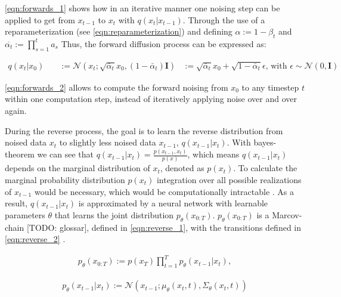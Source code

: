 \autoref{eqn:forwards_1} \cite{ho2020DenoisingDiffusionProbabilistic} shows how in an iterative manner one noising step can be applied to get from $x_{t-1}$ to $x_t$ with $q(x_t | x_{t-1})$.
Through the use of a reparameterization (see \autoref{eqn:reparameterization}) and defining $\alpha := 1-\beta_t$ and $\overline{\alpha_t}:=\prod_{s=1}^{t}a_s$
Thus, the forward diffusion process can be expressed as:

\begin{equation}
  \label{eqn:forwards_2}
  \begin{align*}
    q(x_t | x_0) \quad & := \mathcal{N}(x_t; \sqrt{\bar{\alpha}_t} x_0, (1 - \bar{\alpha}_t) \textbf{I})
     &:= \sqrt{\bar{\alpha}_t} x_0 + \sqrt{1 - \bar{\alpha}_t} \epsilon \textrm{, with } \epsilon\sim\mathcal{N}(0, \textbf{I})
  \end{align*}
\end{equation}

\autoref{eqn:forwards_2}\cite{ho2020DenoisingDiffusionProbabilistic} allows to compute the forward noising from $x_0$ to any timestep $t$ within one computation step, instead of iteratively applying noise over and over again.

During the reverse process, the goal is to learn the reverse distribution from noised data $x_t$ to slightly less noised data $x_{t-1}$, $q(x_{t-1}|x_t)$.
With bayes-theorem we can see that $q(x_{t-1}|x_t) = \frac{p(x_{t-1},x_t)}{p(x)}$, which means $q(x_{t-1}|x_t)$ depends on the marginal distribution of $x_t$, denoted as $p(x_t)$.
To calculate the marginal probability distribution $p(x_t)$ integration over all possible realizations of $x_{t-1}$ would be necessary, which would be computationally intractable \cite{capel2022MasterThesisDenoising}.
As a result, $q(x_{t-1}|x_t)$ is approximated by a neural network with learnable parameters $\theta$ that learns the joint distribution $p_{\theta}(x_{0:T})$.
$p_{\theta}(x_{0:T})$ is a Marcov-chain [TODO: glossar], defined in \autoref{eqn:reverse_1}, with the transitions defined in \autoref{eqn:reverse_2} \cite{capel2022MasterThesisDenoising, ho2020DenoisingDiffusionProbabilistic}.

\begin{equation}
  \label{eqn:reverse_1}
  \begin{align*}
    p_{\theta}(x_{0:T}) := p(x_T) \prod_{t=1}^T p_{\theta}(x_{t-1} | x_t),
  \end{align*}
\end{equation}

\begin{equation}
  \label{eqn:reverse_2}
  \begin{align*}
    p_{\theta}(x_{t-1}|x_t) := \mathcal{N}(x_{t-1}; \mu_{\theta}(x_t, t), \Sigma_{\theta}(x_t, t))
  \end{align*}
\end{equation}
    
